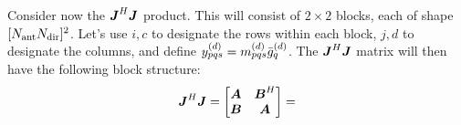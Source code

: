 \documentclass[useAMS,usenatbib]{mn2e}
\makeatletter
\newcommand{\mat}[1]{{\bmath{#1}}}
\newcommand{\JJ}{\mat{J}} %
\newcommand{\JHJ}{\JJ^H\JJ} %
\newcommand{\Matrix}[2]{\left [ \begin{array}{@{}#1@{}}#2\end{array} \right ]}
\newcommand{\AUG}[1]{\bmath{\breve{#1}}}
\newcommand{\Gg}{\AUG{g}}
\newcommand{\Rr}{\AUG{r}}
\newcommand{\Vv}{\AUG{v}}
\newcommand{\LEFT}{\mathrm{L}}
\numberwithin{equation}{section}
\providecommand{\DIFdelbegin}{} %
\makeatother
\begin{document}
Consider now the $\JHJ$ product. This will consist of $2\times2$ blocks, each of shape 
$[N_\mathrm{ant}N_\mathrm{dir}]^2$. Let's use $i,c$ to designate the rows within each block, $j,d$ to designate the columns, 
and define $y^{(d)}_{pqs}=m^{(d)}_{pqs}\bar{g}^{(d)}_q$. The $\JHJ$ matrix will then have the following block 
structure:
\begin{equation}
\JHJ = \Matrix{cc}{\bmath{A}&\bmath{B}^H\\\bmath{B}&\bmath{A}}
= \DIFdelbegin %
\end{equation}%

\end{document}
